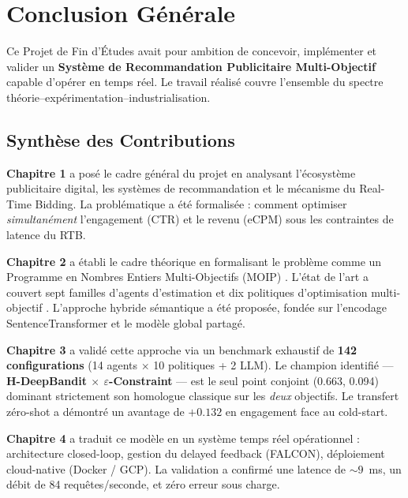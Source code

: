 
\chapter*{Conclusion Générale}

Ce Projet de Fin d'Études avait pour ambition de concevoir, implémenter et valider un \textbf{Système de Recommandation Publicitaire Multi-Objectif} capable d'opérer en temps réel. Le travail réalisé couvre l'ensemble du spectre théorie--expérimentation--industrialisation.

\section*{Synthèse des Contributions}

\textbf{Chapitre 1} a posé le cadre général du projet en analysant l'écosystème publicitaire digital, les systèmes de recommandation et le mécanisme du Real-Time Bidding. La problématique a été formalisée : comment optimiser \textit{simultanément} l'engagement (CTR) et le revenu (eCPM) sous les contraintes de latence du RTB.

\textbf{Chapitre 2} a établi le cadre théorique en formalisant le problème comme un Programme en Nombres Entiers Multi-Objectifs (MOIP) \parencite{deb2001multi}. L'état de l'art a couvert sept familles d'agents d'estimation \parencite{li2010contextual, zhou2020neural, riquelme2018deep} et dix politiques d'optimisation multi-objectif \parencite{deb2002fast, zhang2007moead, ehrgott2005multicriteria}. L'approche hybride sémantique a été proposée, fondée sur l'encodage SentenceTransformer \parencite{reimers2019sentence} et le modèle global partagé.

\textbf{Chapitre 3} a validé cette approche via un benchmark exhaustif de \textbf{142 configurations} (14 agents $\times$ 10 politiques + 2 LLM). Le champion identifié --- \textbf{H-DeepBandit $\times$ $\varepsilon$-Constraint} --- est le seul point conjoint (0.663, 0.094) dominant strictement son homologue classique sur les \textit{deux} objectifs. Le transfert zéro-shot a démontré un avantage de $+0.132$ en engagement face au cold-start.

\textbf{Chapitre 4} a traduit ce modèle en un système temps réel opérationnel : architecture closed-loop, gestion du delayed feedback (FALCON), déploiement cloud-native (Docker / GCP). La validation a confirmé une latence de $\sim 9$~ms, un débit de 84 requêtes/seconde, et zéro erreur sous charge.

